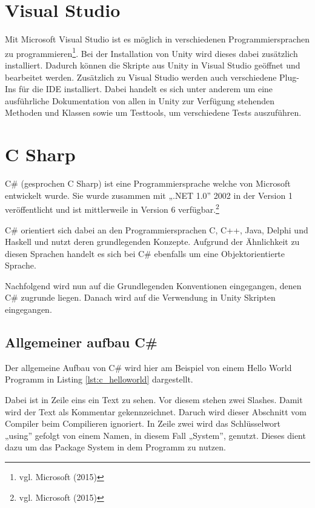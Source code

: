 \section{Visual Studio}

	Mit Microsoft Visual Studio ist es möglich in verschiedenen Programmiersprachen zu programmieren\footnote{vgl. Microsoft \cite{microsoft1} (2015)}. Bei der Installation von Unity wird dieses dabei zusätzlich installiert. Dadurch können die Skripte aus Unity in Visual Studio geöffnet und bearbeitet werden. Zusätzlich zu Visual Studio werden auch verschiedene Plug-Ins für die IDE installiert. Dabei handelt es sich unter anderem um eine ausführliche Dokumentation von allen in Unity zur Verfügung stehenden Methoden und Klassen sowie um Testtools, um verschiedene Tests auszuführen. 

\section{C Sharp}

	C\# (gesprochen C Sharp) ist eine Programmiersprache welche von Microsoft entwickelt wurde. Sie wurde zusammen mit „.NET 1.0” 2002 in der Version 1 veröffentlicht und ist mittlerweile in Version 6 verfügbar.\footnote{vgl. Microsoft \cite{microsoft2} (2015)} 

	C\# orientiert sich dabei an den Programmiersprachen C, C++, Java, Delphi und Haskell und nutzt deren grundlegenden Konzepte. Aufgrund der Ähnlichkeit zu diesen Sprachen handelt es sich bei C\# ebenfalls um eine Objektorientierte Sprache. 

	Nachfolgend wird nun auf die Grundlegenden Konventionen eingegangen, denen C\# zugrunde liegen. Danach wird auf die Verwendung in Unity Skripten eingegangen.

\subsection{Allgemeiner aufbau C\#}

	Der allgemeine Aufbau von C\# wird hier am Beispiel von einem Hello World Programm in Listing \ref{lst:c_helloworld} dargestellt. 

	Dabei ist in Zeile eins ein Text zu sehen. Vor diesem stehen zwei Slashes. Damit wird der Text als Kommentar gekennzeichnet. Daruch wird dieser Abschnitt vom Compiler beim Compilieren ignoriert. In Zeile zwei wird das Schlüsselwort „using” gefolgt von einem Namen, in diesem Fall „System”, genutzt. Dieses dient dazu um das Package System in dem Programm zu nutzen.

